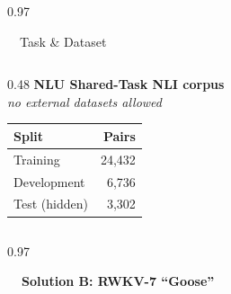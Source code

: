 \documentclass[final,t]{beamer}
\begin{document}
\begin{frame}[t]
\begin{columns}[t,totalwidth=\paperwidth]
\begin{column}{0.97\paperwidth}
\begin{block}{\faBullseye\ \ Task \& Dataset}
\begin{columns}[c]
\begin{column}{0.48\textwidth}
\centering
\textbf{NLU Shared-Task NLI corpus}\\
\emph{no external datasets allowed}\\[0.2em]
\renewcommand{\arraystretch}{1.05}
\begin{tabular}{lr}
\toprule
\textbf{Split} & \textbf{Pairs} \\
\midrule
Training        & 24{,}432 \\
Development     & 6{,}736  \\
Test (hidden)   & 3{,}302  \\
\bottomrule
\end{tabular}
\end{column}

\end{columns}
\vspace{-0.3em}
\end{block}

\end{column}
\end{columns}

\vspace{0.6cm}

\newlength{\solncolheight}
\setlength{\solncolheight}{32.5cm}
\newlength{\solncolwidth}
\setlength{\solncolwidth}{0.481\paperwidth}

\begin{columns}[t,totalwidth=\paperwidth]
\begin{column}{0.97\paperwidth}
\noindent
\begin{minipage}[t][\solncolheight][t]{\solncolwidth}

\vspace*{0pt}
{\centering
\colorbox{rwkvBlue}{\color{white}\large\bfseries
\hspace{0.4em}\faCrow\ \ Solution B: RWKV-7 ``Goose''\hspace{0.4em}}\par}
\vspace{0.1cm}


\end{minipage}
\end{column}
\end{columns}
\end{frame}
\end{document}
